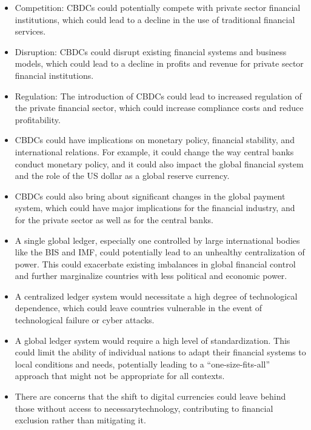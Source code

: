 \begin{itemize}
\item Competition: CBDCs could potentially compete with private sector financial institutions, which could lead to a decline in the use of traditional financial services.
\item Disruption: CBDCs could disrupt existing financial systems and business models, which could lead to a decline in profits and revenue for private sector financial institutions.
\item Regulation: The introduction of CBDCs could lead to increased regulation of the private financial sector, which could increase compliance costs and reduce profitability.
\item CBDCs could have implications on monetary policy, financial stability, and international relations. For example, it could change the way central banks conduct monetary policy, and it could also impact the global financial system and the role of the US dollar as a global reserve currency. 
\item CBDCs could also bring about significant changes in the global payment system, which could have major implications for the financial industry, and for the private sector as well as for the central banks.
\item A single global ledger, especially one controlled by large international bodies like the BIS and IMF, could potentially lead to an unhealthy centralization of power. This could exacerbate existing imbalances in global financial control and further marginalize countries with less political and economic power.
\item A centralized ledger system would necessitate a high degree of technological dependence, which could leave countries vulnerable in the event of technological failure or cyber attacks.
\item A global ledger system would require a high level of standardization. This could limit the ability of individual nations to adapt their financial systems to local conditions and needs, potentially leading to a ``one-size-fits-all'' approach that might not be appropriate for all contexts.
\item There are concerns that the shift to digital currencies could leave behind those without access to necessarytechnology, contributing to financial exclusion rather than mitigating it.
\end{itemize} 

